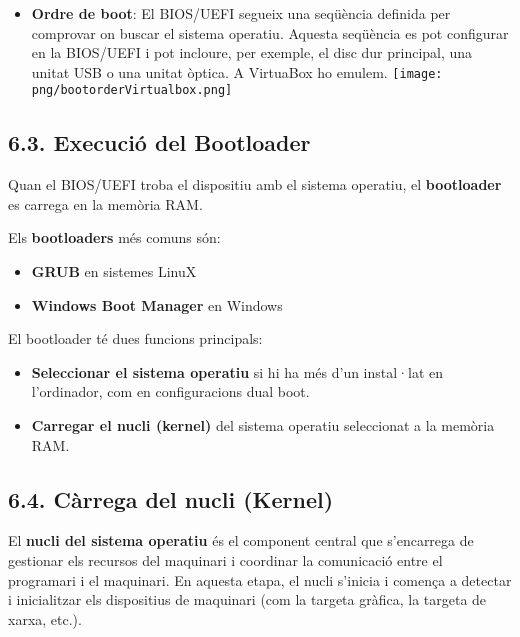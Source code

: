 \documentclass[
  a4paper,
]{article}
\providecommand{\tightlist}{%
  \setlength{\itemsep}{0pt}\setlength{\parskip}{0pt}}
\begin{document}
\begin{itemize}
\tightlist
\item
  \textbf{Ordre de boot}: El BIOS/UEFI segueix una seqüència definida
  per comprovar on buscar el sistema operatiu. Aquesta seqüència es pot
  configurar en la BIOS/UEFI i pot incloure, per exemple, el disc dur
  principal, una unitat USB o una unitat òptica. A VirtuaBox ho emulem.
  \texttt{[image: png/bootorderVirtualbox.png]}
\end{itemize}

\subsection{\texorpdfstring{6.3. \textbf{Execució del
Bootloader}}{6.3. Execució del Bootloader}}\label{execuciuxf3-del-bootloader}

Quan el BIOS/UEFI troba el dispositiu amb el sistema operatiu, el
\textbf{bootloader} es carrega en la memòria RAM.

Els \textbf{bootloaders} més comuns són:

\begin{itemize}
\tightlist
\item
  \textbf{GRUB} en sistemes LinuX
\item
  \textbf{Windows Boot Manager} en Windows
\end{itemize}

El bootloader té dues funcions principals:

\begin{itemize}
\tightlist
\item
  \textbf{Seleccionar el sistema operatiu} si hi ha més d'un instal·lat
  en l'ordinador, com en configuracions dual boot.
\item
  \textbf{Carregar el nucli (kernel)} del sistema operatiu seleccionat a
  la memòria RAM.
\end{itemize}

\subsection{\texorpdfstring{6.4. \textbf{Càrrega del nucli
(Kernel)}}{6.4. Càrrega del nucli (Kernel)}}\label{cuxe0rrega-del-nucli-kernel}

El \textbf{nucli del sistema operatiu} és el component central que
s'encarrega de gestionar els recursos del maquinari i coordinar la
comunicació entre el programari i el maquinari. En aquesta etapa, el
nucli s'inicia i comença a detectar i inicialitzar els dispositius de
maquinari (com la targeta gràfica, la targeta de xarxa, etc.).
\end{document}
